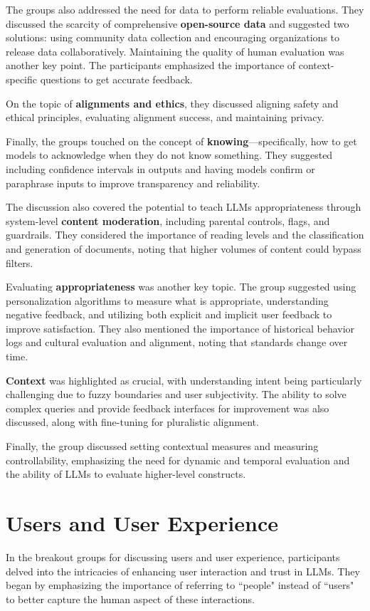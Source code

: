 \documentclass[11pt,dvipdfm]{article}
\begin{document}
The groups also addressed the need for data to perform reliable evaluations. They discussed the scarcity of comprehensive {\bf open-source data} and suggested two solutions: using community data collection and encouraging organizations to release data collaboratively. Maintaining the quality of human evaluation was another key point. The participants emphasized the importance of context-specific questions to get accurate feedback.

On the topic of {\bf alignments and ethics}, they discussed aligning safety and ethical principles, evaluating alignment success, and maintaining privacy.

Finally, the groups touched on the concept of {\bf knowing}—specifically, how to get models to acknowledge when they do not know something. They suggested including confidence intervals in outputs and having models confirm or paraphrase inputs to improve transparency and reliability.

The discussion also covered the potential to teach LLMs appropriateness through system-level {\bf content moderation}, including parental controls, flags, and guardrails. They considered the importance of reading levels and the classification and generation of documents, noting that higher volumes of content could bypass filters.

Evaluating {\bf appropriateness} was another key topic. The group suggested using personalization algorithms to measure what is appropriate, understanding negative feedback, and utilizing both explicit and implicit user feedback to improve satisfaction. They also mentioned the importance of historical behavior logs and cultural evaluation and alignment, noting that standards change over time.

{\bf Context} was highlighted as crucial, with understanding intent being particularly challenging due to fuzzy boundaries and user subjectivity. The ability to solve complex queries and provide feedback interfaces for improvement was also discussed, along with fine-tuning for pluralistic alignment.

Finally, the group discussed setting contextual measures and measuring controllability, emphasizing the need for dynamic and temporal evaluation and the ability of LLMs to evaluate higher-level constructs.

\section{Users and User Experience}
In the breakout groups for discussing users and user experience, participants delved into the intricacies of enhancing user interaction and trust in LLMs. They began by emphasizing the importance of referring to ``people" instead of ``users" to better capture the human aspect of these interactions.
\end{document}
